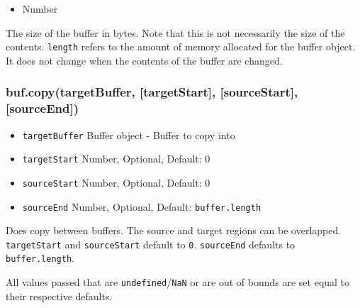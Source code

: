 \begin{itemize}
\item
  Number
\end{itemize}

The size of the buffer in bytes. Note that this is not necessarily the
size of the contents. \texttt{length} refers to the amount of memory
allocated for the buffer object. It does not change when the contents of
the buffer are changed.

\begin{Shaded}
\begin{Highlighting}[]
 \NormalTok{);}

\NormalTok{(}\NormalTok{);}
\NormalTok{(}\NormalTok{, }\NormalTok{, }\NormalTok{);}
\NormalTok{(}\NormalTok{);}

\end{Highlighting}
\end{Shaded}

\subsubsection{buf.copy(targetBuffer, {[}targetStart{]},
{[}sourceStart{]}, {[}sourceEnd{]})}

\begin{itemize}
\item
  \texttt{targetBuffer} Buffer object - Buffer to copy into
\item
  \texttt{targetStart} Number, Optional, Default: 0
\item
  \texttt{sourceStart} Number, Optional, Default: 0
\item
  \texttt{sourceEnd} Number, Optional, Default: \texttt{buffer.length}
\end{itemize}

Does copy between buffers. The source and target regions can be
overlapped. \texttt{targetStart} and \texttt{sourceStart} default to
\texttt{0}. \texttt{sourceEnd} defaults to \texttt{buffer.length}.

All values passed that are \texttt{undefined}/\texttt{NaN} or are out of
bounds are set equal to their respective defaults.

